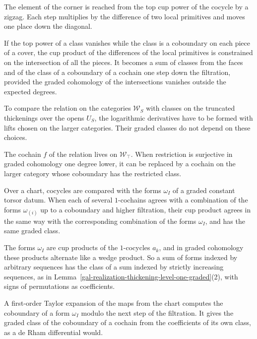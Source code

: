 The element of the corner is reached from the top cup power of the cocycle by a zigzag. Each step multiplies by the
difference of two local primitives and moves one place down the diagonal.

If the top power of a class vanishes while the class is a coboundary on each piece of a cover, the cup product of the
differences of the local primitives is constrained on the intersection of all the pieces. It becomes a sum of classes
from the faces and of the class of a coboundary of a cochain one step down the filtration, provided the graded
cohomology of the intersections vanishes outside the expected degrees.

To compare the relation on the categories $\mathcal W_S$ with classes on the truncated thickenings over the opens $U_S$,
the logarithmic derivatives have to be formed with lifts chosen on the larger categories. Their graded classes do not
depend on these choices.

The cochain $f$ of the relation lives on $\mathcal W_\top$. When restriction is surjective in graded cohomology one degree
lower, it can be replaced by a cochain on the larger category whose coboundary has the restricted class.

Over a chart, cocycles are compared with the forms $\omega_I$ of a graded constant torsor datum. When each of several
$1$-cochains agrees with a combination of the forms $\omega_{(i)}$ up to a coboundary and higher filtration, their cup
product agrees in the same way with the corresponding combination of the forms $\omega_I$, and has the same graded class.

The forms $\omega_I$ are cup products of the $1$-cocycles $a_k$, and in graded cohomology these products alternate like a
wedge product. So a sum of forms indexed by arbitrary sequences has the class of a sum indexed by strictly increasing
sequences, as in Lemma~\ref{gal-realization-thickening-level-one-graded}(2), with signs of permutations as coefficients.

A first-order Taylor expansion of the maps from the chart computes the coboundary of a form $\omega_I$ modulo the next
step of the filtration. It gives the graded class of the coboundary of a cochain from the coefficients of its own class,
as a de Rham differential would.

